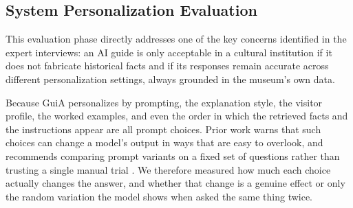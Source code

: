 %

\subsection{System Personalization Evaluation}

This evaluation phase directly addresses one of the key concerns identified in the expert interviews: an AI guide is only acceptable in a cultural institution if it does not fabricate historical facts and if its responses remain accurate across different personalization settings, always grounded in the museum's own data.

Because GuiA personalizes by prompting, the explanation style, the visitor profile, the worked examples, and even the order in which the retrieved facts and the instructions appear are all prompt choices. Prior work warns that such choices can change a model's output in ways that are easy to overlook, and recommends comparing prompt variants on a fixed set of questions rather than trusting a single manual trial \cite{PromptSurvey2024}. We therefore measured how much each choice actually changes the answer, and whether that change is a genuine effect or only the random variation the model shows when asked the same thing twice.

